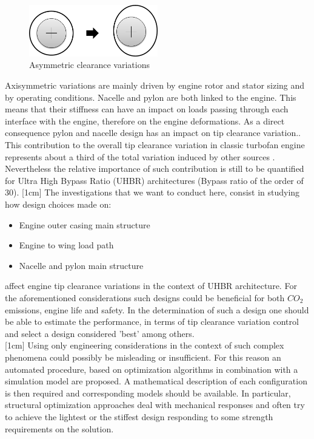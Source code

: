 \begin{figure}[!ht]
\centering   
 \includegraphics[width=0.5\textwidth]{images/intro/asym_tip}
     \caption{Asymmetric clearance variations} 
     \label{fig.intro4}
\end{figure}
Axisymmetric variations are mainly driven by engine rotor and stator sizing and by operating conditions. Nacelle and pylon are both linked to the engine. This means that their stiffness can have an impact on loads passing through each interface with the engine, therefore on the engine deformations. As a direct consequence pylon and nacelle design has an impact on tip clearance variation.\cite{lattime2002turbine}.  This contribution to the overall tip clearance variation in classic turbofan engine represents about a third of the total variation induced by other sources \cite{lattime2002turbine}. Nevertheless the relative importance of such contribution is still to be quantified for Ultra High Bypass Ratio (UHBR) architectures (Bypass ratio of the order of 30).\newpage
{}[1cm] 
 The investigations that we want to conduct here, consist in studying how design choices made on:
 \begin{itemize}
 \item Engine outer casing main structure
 \item Engine to wing load path
 \item Nacelle and pylon main structure
 \end{itemize}
affect engine tip clearance variations in the context of UHBR architecture. For the aforementioned considerations such designs could be beneficial for both $CO_2$ emissions, engine life and safety. 
 In the determination of such a design one should be able to estimate the performance, in terms of tip clearance variation control and select a design considered 'best' among others.\\ 
 [1cm]
 Using only engineering considerations in the context of such complex phenomena could possibly be misleading or insufficient. For this reason an automated procedure, based on optimization algorithms in combination with a simulation model are proposed. A mathematical description of each configuration is then required and corresponding models should be available. In particular, structural optimization approaches deal with mechanical responses and often try to achieve the lightest or the stiffest design responding to some strength requirements on the solution. \\
